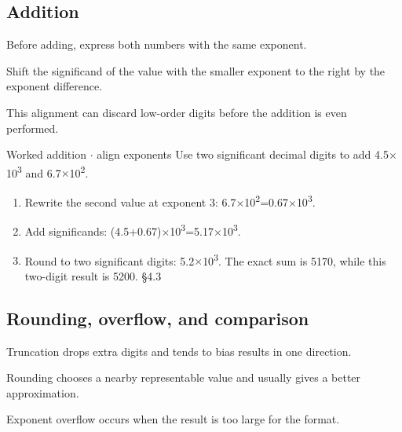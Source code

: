 \documentclass[11pt]{article}
\begin{document}
\begin{keepsection}
\begin{keepsection}
\subsection{Addition}

Before adding, express both numbers with the same exponent.

Shift the significand of the value with the smaller exponent to the right by the exponent difference.

This alignment can discard low-order digits before the addition is even performed.

\begin{workedbox}{Worked addition \ensuremath{\cdot} align exponents}
Use two significant decimal digits to add 4.5\ensuremath{\times}10\textsuperscript{3} and 6.7\ensuremath{\times}10\textsuperscript{2}.

\begin{enumerate}
\item Rewrite the second value at exponent 3: 6.7\ensuremath{\times}10\textsuperscript{2}=0.67\ensuremath{\times}10\textsuperscript{3}.
\item Add significands: (4.5+0.67)\ensuremath{\times}10\textsuperscript{3}=5.17\ensuremath{\times}10\textsuperscript{3}.
\item Round to two significant digits: 5.2\ensuremath{\times}10\textsuperscript{3}. The exact sum is 5170, while this two-digit result is 5200. \hfill{\small\color{FAUblue}§4.3}
\end{enumerate}
\end{workedbox}
\end{keepsection}

\begin{keepsection}
\subsection{Rounding, overflow, and comparison}

Truncation drops extra digits and tends to bias results in one direction.

Rounding chooses a nearby representable value and usually gives a better approximation.

Exponent overflow occurs when the result is too large for the format.


\end{keepsection}
\end{keepsection}
\end{document}
